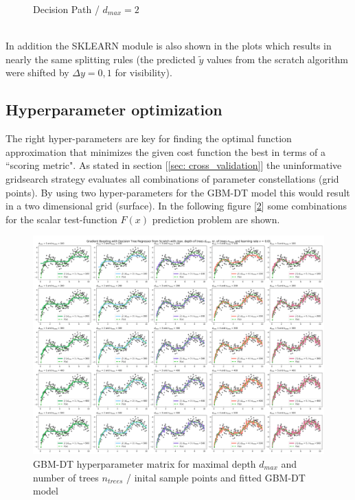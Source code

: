 \documentclass[12pt, a4paper]{article}
\begin{document}
\begin{figure}[htbp]
\begin{minipage}[t]{8cm}
\caption[Decision Path / Two Layers]{Decision Path / $d_{max} = 2$}
\label{fig: dt_split_2}
\end{minipage}
\end{figure}
\\
In addition the SKLEARN module \cite{Scikit2023} is also shown in the plots which results in nearly the same splitting rules (the predicted $\tilde{y}$ values from the scratch algorithm were shifted by $\Delta y = 0{,}1$ for visibility).
\newpage
\subsection{Hyperparameter optimization}
The right hyper-parameters are key for finding the optimal function approximation that minimizes the given cost function the best in terms of a ``scoring metric". As stated in section [\ref{sec: cross_validation}] the uninformative gridsearch strategy evaluates all combinations of parameter constellations (grid points). By using two hyper-parameters for the GBM-DT model this would result in a two dimensional grid (surface). In the following figure [\ref{fig: gbm_hyper_matrix}] some combinations for the scalar test-function $F(x)$ prediction problem are shown.
\begin{figure}[!htpb]
    \centering
    \includegraphics[width=1\textwidth,trim={0.5 0 0 0},clip]{figures/gbm_with_decision_tree_various_parameters.png}
    \caption[GBM-DT hyperparameter matrix]{GBM-DT hyperparameter matrix for maximal depth $d_{max}$ and number of trees $n_{trees}$ / inital sample points and fitted GBM-DT model}
    \label{fig: gbm_hyper_matrix}
\end{figure}
\end{document}
